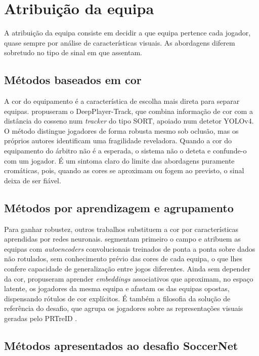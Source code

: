\section{Atribuição da equipa}

A atribuição da equipa consiste em decidir a que equipa pertence cada jogador, quase sempre por análise de características visuais. As abordagens diferem sobretudo no tipo de sinal em que assentam.

\subsection{Métodos baseados em cor}

A cor do equipamento é a característica de escolha mais direta para separar equipas. \citet{naik2022deepplayer} propuseram o DeepPlayer-Track, que combina informação de cor com a distância do cosseno num \emph{tracker} do tipo SORT, apoiado num detetor YOLOv4. O método distingue jogadores de forma robusta mesmo sob oclusão, mas os próprios autores identificam uma fragilidade reveladora. Quando a cor do equipamento do árbitro não é a esperada, o sistema não o deteta e confunde-o com um jogador. É um sintoma claro do limite das abordagens puramente cromáticas, pois, quando as cores se aproximam ou fogem ao previsto, o sinal deixa de ser fiável.

\subsection{Métodos por aprendizagem e agrupamento}

Para ganhar robustez, outros trabalhos substituem a cor por características aprendidas por redes neuronais. \citet{alhejaily2023team} segmentam primeiro o campo e atribuem as equipas com \emph{autoencoders} convolucionais treinados de ponta a ponta sobre dados não rotulados, sem conhecimento prévio das cores de cada equipa, o que lhes confere capacidade de generalização entre jogos diferentes. Ainda sem depender da cor, \citet{istasse2019associative} propuseram aprender \emph{embeddings} associativos que aproximam, no espaço latente, os jogadores da mesma equipa e afastam os das equipas opostas, dispensando rótulos de cor explícitos. É também a filosofia da solução de referência do desafio, que agrupa os jogadores sobre as representações visuais geradas pelo PRTreID \citep{somers2024soccernet}.

\subsection{Métodos apresentados ao desafio SoccerNet}\label{sec:equipa-desafio}

